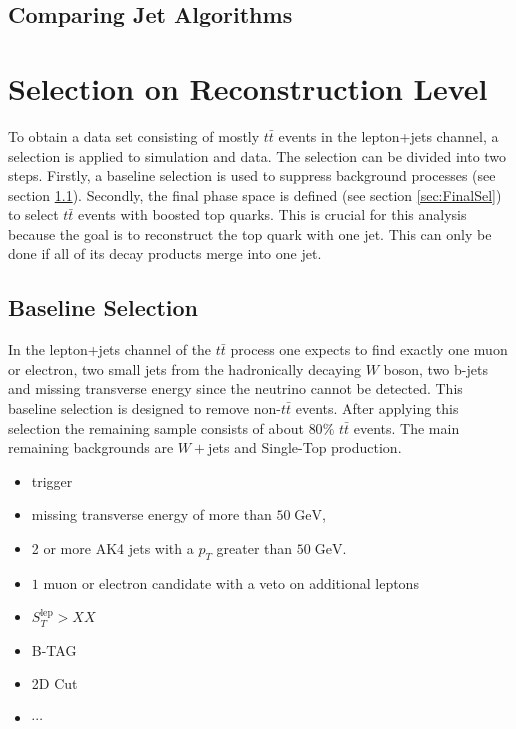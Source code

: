 \subsection{Comparing Jet Algorithms}

\section{Selection on Reconstruction Level}
\label{sec:selection}
	To obtain a data set consisting of mostly $t\bar{t}$ events in the lepton+jets channel, a selection is applied to simulation and data. The selection can be divided into two steps. Firstly, a baseline selection is used to suppress background processes (see section \ref{sec:PreSel}). Secondly, the final phase space is defined (see section \ref{sec:FinalSel}) to select $t\bar{t}$ events with boosted top quarks. This is crucial for this analysis because the goal is to reconstruct the top quark with one jet. This can only be done if all of its decay products merge into one jet.
\subsection{Baseline Selection}
\label{sec:PreSel}
	In the lepton+jets channel of the $t\bar{t}$ process one expects to find exactly one muon or electron, two small jets from the hadronically decaying $W$ boson, two b-jets and missing transverse energy since the neutrino cannot be detected. This baseline selection is designed to remove non-$t\bar{t}$ events. After applying this selection the remaining sample consists of about $80\%$ $t\bar{t}$ events. The main remaining backgrounds are $W+$jets and Single-Top production. 
	\begin{itemize}
	\item trigger
	\item missing transverse energy of more than $50\;\text{GeV}$,
	\item 2 or more AK4 jets with a $p_T$ greater than $50\;\text{GeV}$.
	\item $1$ muon or electron candidate with a veto on additional leptons
	\item $S_T^\text{lep} > XX$
	\item B-TAG
	\item 2D Cut
	\item $\cdots$	
	\end{itemize}
	
 

